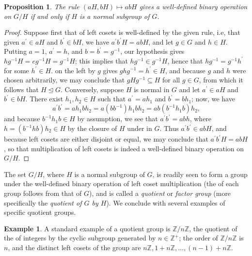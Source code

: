 \documentclass[12pt]{article}
\theoremstyle{plain}
\newtheorem*{proposition*}{Proposition}
\theoremstyle{definition}
\newtheorem*{example*}{Example}
\begin{document}
\begin{proposition*}
The rule $(aH,bH)\mapsto abH$ gives a well-defined binary operation on $G/H$ if and only if $H$ is a normal subgroup 
of $G$.
\end{proposition*} 
\begin{proof}
Suppose first that  of left cosets is well-defined by the given rule, i.e, that given $a^\prime\in aH$ and 
$b^\prime\in bH$, we have $a^\prime b^\prime H=abH$, and let $g\in G$ and $h\in H$. Putting $a=1$, $a^\prime=h$, and $b=b^\prime=g^{-1}$, our hypothesis gives $hg^{-1}H=eg^{-1}H=g^{-1}H$; this implies that $hg^{-1}\in g^{-1}H$, hence that $hg^{-1}=g^{-1}h^\prime$ for some $h^\prime\in H$.  on the left by $g$ gives $ghg^{-1}=h^\prime\in H$, and because $g$ and $h$ were chosen arbitrarily, we may conclude that $gHg^{-1}\subseteq H$ for all $g\in G$, from which it follows that $H\unlhd G$. Conversely, suppose $H$ is normal in $G$ and let $a^\prime\in aH$ and $b^\prime\in bH$. There exist $h_1,h_2\in H$ such that $a^\prime=ah_1$ and $b^\prime=bh_1$; now, we have
\begin{equation*}
a^\prime b^\prime=ah_1bh_2=a(bb^{-1})h_1bh_2
=ab(b^{-1}h_1b)h_2\text{,}
\end{equation*}
and because $b^{-1}h_1b\in H$ by assumption, we see that $a^\prime b^\prime=abh$, where $h=(b^{-1}hb)h_2\in H$
by the closure of $H$ under  in $G$. Thus $a^\prime b^\prime\in abH$, and because left cosets 
are either disjoint or equal, we may conclude that $a^\prime b^\prime H=abH$, so that multiplication
of left cosets is indeed a well-defined binary operation on $G/H$. 
\end{proof}

The set $G/H$, where $H$ is a normal subgroup of $G$, is readily seen to form a group under the well-defined
binary operation of left coset multiplication (the  of each group  follows from that of $G$), and is called a \emph{quotient} or \emph{factor group} (more specifically
the \emph{quotient of $G$ by $H$}). We conclude with several examples of specific quotient groups.

\begin{example*}
A standard example of a quotient group is $\mathbb{Z}/n\mathbb{Z}$, the quotient of the  of integers by the cyclic subgroup generated by $n\in\mathbb{Z}^+$; the order of $\mathbb{Z}/n\mathbb{Z}$ is $n$, and the 
distinct left cosets of the group are $n\mathbb{Z},1+n\mathbb{Z},\ldots,(n-1)+n\mathbb{Z}$. 
\end{example*}
\end{document}
